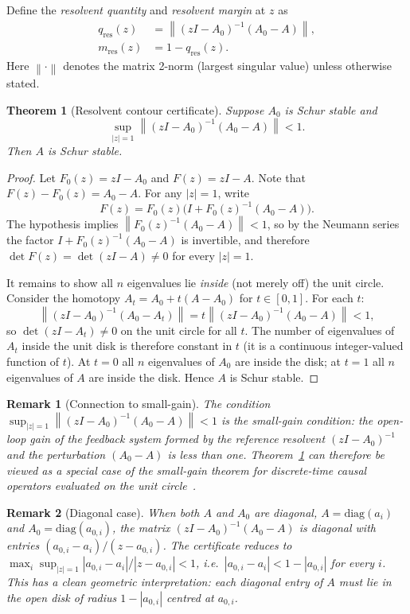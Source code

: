 \documentclass{article}
\newtheorem{theorem}{Theorem}
\newtheorem{remark}{Remark}
\theoremstyle{definition}
\newcommand{\norm}[1]{\left\|#1\right\|}
\begin{document}
Define the \emph{resolvent quantity} and \emph{resolvent margin} at $z$ as
\begin{align}
  q_{\mathrm{res}}(z) &= \norm{(zI - A_0)^{-1}(A_0 - A)}, \\
  m_{\mathrm{res}}(z) &= 1 - q_{\mathrm{res}}(z).
\end{align}
Here $\norm{\cdot}$ denotes the matrix 2-norm (largest singular value) unless
otherwise stated.

\begin{theorem}[Resolvent contour certificate]
\label{thm:res}
Suppose $A_0$ is Schur stable and
\[
  \sup_{|z|=1} \norm{(zI - A_0)^{-1}(A_0 - A)} < 1.
\]
Then $A$ is Schur stable.
\end{theorem}

\begin{proof}
Let $F_0(z) = zI - A_0$ and $F(z) = zI - A$.  Note that $F(z) - F_0(z) =
A_0 - A$.  For any $|z| = 1$, write
\[
  F(z) = F_0(z)\bigl(I + F_0(z)^{-1}(A_0 - A)\bigr).
\]
The hypothesis implies $\norm{F_0(z)^{-1}(A_0 - A)} < 1$, so by the
Neumann series the factor $I + F_0(z)^{-1}(A_0 - A)$ is invertible, and
therefore $\det F(z) = \det(zI - A) \neq 0$ for every $|z| = 1$.

It remains to show all $n$ eigenvalues lie \emph{inside} (not merely off) the
unit circle.  Consider the homotopy $A_t = A_0 + t(A - A_0)$ for
$t \in [0, 1]$.  For each $t$:
\[
  \norm{(zI - A_0)^{-1}(A_0 - A_t)} = t \norm{(zI - A_0)^{-1}(A_0 - A)} < 1,
\]
so $\det(zI - A_t) \neq 0$ on the unit circle for all $t$.  The number of
eigenvalues of $A_t$ inside the unit disk is therefore constant in $t$ (it is
a continuous integer-valued function of $t$).  At $t = 0$ all $n$ eigenvalues
of $A_0$ are inside the disk; at $t = 1$ all $n$ eigenvalues of $A$ are
inside the disk.  Hence $A$ is Schur stable.
\end{proof}

\begin{remark}[Connection to small-gain]
The condition $\sup_{|z|=1} \norm{(zI-A_0)^{-1}(A_0-A)} < 1$ is the
small-gain condition: the open-loop gain of the feedback system formed by the
reference resolvent $(zI - A_0)^{-1}$ and the perturbation $(A_0 - A)$ is
less than one.  Theorem~\ref{thm:res} can therefore be viewed as a special
case of the small-gain theorem for discrete-time causal operators
evaluated on the unit circle~\cite{desoer1975feedback}.
\end{remark}

\begin{remark}[Diagonal case]
When both $A$ and $A_0$ are diagonal, $A = \mathrm{diag}(a_i)$ and $A_0 =
\mathrm{diag}(a_{0,i})$, the matrix $(zI - A_0)^{-1}(A_0 - A)$ is diagonal
with entries $(a_{0,i} - a_i)/(z - a_{0,i})$.  The certificate reduces to
$\max_i \sup_{|z|=1} |a_{0,i} - a_i|/|z - a_{0,i}| < 1$, i.e.\
$|a_{0,i} - a_i| < 1 - |a_{0,i}|$ for every $i$.
This has a clean geometric interpretation: each diagonal entry of $A$ must
lie in the open disk of radius $1 - |a_{0,i}|$ centred at $a_{0,i}$.
\end{remark}
\end{document}
